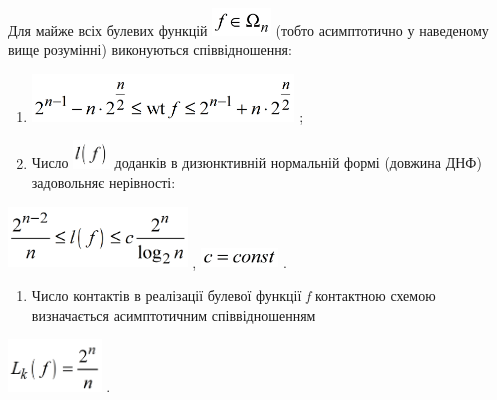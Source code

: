 \documentclass[a4paper]{article}
\newcounter{saveenum}
\newcommand\liststyleWWviiiNumvi{%
\renewcommand\theenumi{\arabic{enumi}}
\renewcommand\theenumii{\arabic{enumii}}
\renewcommand\theenumiii{\arabic{enumiii}}
\renewcommand\theenumiv{\arabic{enumiv}}
\renewcommand\labelenumi{\theenumi)}
\renewcommand\labelenumii{\theenumii.}
\renewcommand\labelenumiii{\theenumiii.}
\renewcommand\labelenumiv{\theenumiv.}
}
\newcounter{}
\begin{document}
Для майже всіх булевих функцій 
\includegraphics[width=0.611in,height=0.2874in]{crypt-img/crypt-img171.png} 
(тобто асимптотично у наведеному вище розумінні) виконуються співвідношення:

\liststyleWWviiiNumvi
\begin{enumerate}
\item 
\includegraphics[width=2.7366in,height=0.5008in]{crypt-img/crypt-img172.png} ;
\item Число 
\includegraphics[width=0.3819in,height=0.2945in]{crypt-img/crypt-img173.png} 
доданків в диз{\textquotesingle}юнктивній нормальній формі (довжина ДНФ)
задовольняє нерівності:
\end{enumerate}
{\centering
 \includegraphics[width=1.8701in,height=0.6311in]{crypt-img/crypt-img174.png} , 
\includegraphics[width=0.8083in,height=0.2071in]{crypt-img/crypt-img175.png} .
\par}

\liststyleWWviiiNumvi
\setcounter{saveenum}{\value{enumi}}
\begin{enumerate}
\setcounter{enumi}{\value{saveenum}}
\item Число контактів в реалізації булевої функції \textit{f }контактною схемою
визначається асимптотичним співвідношенням
\end{enumerate}
{\centering
 \includegraphics[width=0.9752in,height=0.552in]{crypt-img/crypt-img176.png} .
\par}
\end{document}
